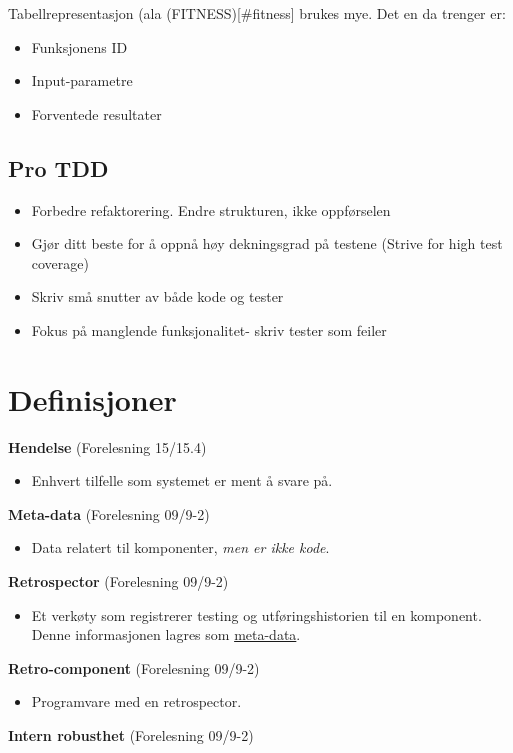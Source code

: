 Tabellrepresentasjon (ala (FITNESS){[}\#fitness{]} brukes mye. Det en da
trenger er:

\begin{itemize}
\item
  Funksjonens ID
\item
  Input-parametre
\item
  Forventede resultater
\end{itemize}
\subsection{Pro TDD}

\begin{itemize}
\item
  Forbedre refaktorering. Endre strukturen, ikke oppførselen
\item
  Gjør ditt beste for å oppnå høy dekningsgrad på testene (Strive for
  high test coverage)
\item
  Skriv små snutter av både kode og tester
\item
  Fokus på manglende funksjonalitet- skriv tester som feiler
\end{itemize}
\section{Definisjoner}

\textbf{Hendelse} (Forelesning 15/15.4)

\begin{itemize}
\item
  Enhvert tilfelle som systemet er ment å svare på.
\end{itemize}
\textbf{Meta-data} (Forelesning 09/9-2)

\begin{itemize}
\item
  Data relatert til komponenter, \emph{men er ikke kode}.
\end{itemize}
\textbf{Retrospector} (Forelesning 09/9-2)

\begin{itemize}
\item
  Et verkøty som registrerer testing og utføringshistorien til en
  komponent. Denne informasjonen lagres som
  \href{\#componentmeta-data}{meta-data}.
\end{itemize}
\textbf{Retro-component} (Forelesning 09/9-2)

\begin{itemize}
\item
  Programvare med en retrospector.
\end{itemize}
\textbf{Intern robusthet} (Forelesning 09/9-2)

